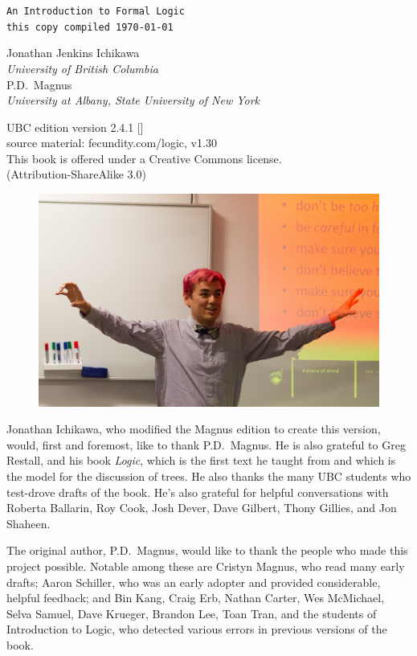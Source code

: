 \thispagestyle{empty}
{\Huge\forallx}

{\tt An Introduction to Formal Logic\\
this copy compiled \today}
\vfill



{\sf Jonathan Jenkins Ichikawa}\\
\emph{University of British Columbia}
\\
{\sf P.D.\ Magnus}\\
\emph{University at Albany, State University of New York}\\




\vfill




{\sf
	UBC edition version 2.4.1 [\bookversion]\\
	source material: fecundity.com/logic, v1.30\\
	This book is offered under a Creative Commons license.\\
	(Attribution-ShareAlike 3.0)
}



\newpage
\thispagestyle{empty}%

\begin{figure}[h!]
  \includegraphics[width=\linewidth]{images/ichikawa.jpg}
  \centering
\end{figure}

{\sf
Jonathan Ichikawa, who modified the Magnus edition to create this version, would, first and foremost, like to thank P.D.\ Magnus. He is also grateful to Greg Restall, and his book \emph{Logic}, which is the first text he taught from and which is the model for the discussion of trees. He also thanks the many UBC students who test-drove drafts of the book. He's also grateful for helpful conversations with Roberta Ballarin, Roy Cook, Josh Dever, Dave Gilbert, Thony Gillies, and Jon Shaheen.

The original author, P.D.\ Magnus, would like to thank the people who made this project possible. Notable among these are Cristyn Magnus, who read many early drafts; Aaron Schiller, who was an early adopter and provided considerable, helpful feedback; {and} Bin Kang, Craig Erb, Nathan Carter, Wes McMichael, Selva Samuel, Dave Krueger, Brandon Lee, Toan Tran, and the students of Introduction to Logic, who detected various errors in previous versions of the book.
}

